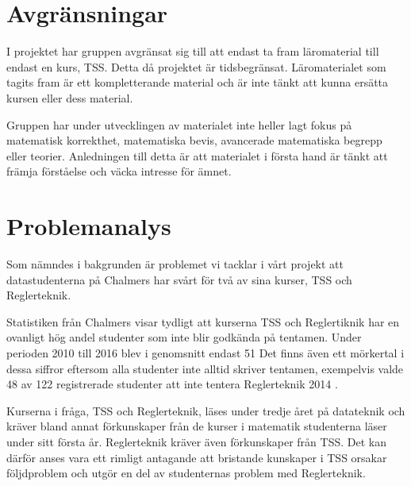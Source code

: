 \documentclass[]{article}
\begin{document}
\section{Avgränsningar}

I projektet har gruppen avgränsat sig till att endast ta fram läromaterial till endast en kurs, TSS. Detta då projektet är tidsbegränsat. Läromaterialet som tagits fram är ett kompletterande material och är inte tänkt att kunna ersätta kursen eller dess material.

Gruppen har under utvecklingen av materialet inte heller lagt fokus på matematisk korrekthet, matematiska bevis, avancerade matematiska begrepp eller teorier.  Anledningen till detta är att materialet  i första hand är tänkt att främja förståelse och väcka intresse för ämnet. 

\section{Problemanalys}


Som nämndes i bakgrunden är problemet vi tacklar i vårt projekt att datastudenterna på Chalmers har svårt för två av sina kurser, TSS och Reglerteknik. 

Statistiken från Chalmers visar tydligt att kurserna TSS och Reglertiknik har en ovanligt hög andel studenter som inte blir godkända på tentamen. Under perioden 2010 till 2016 blev i genomsnitt endast 51%
Det finns även ett mörkertal i dessa siffror eftersom alla studenter inte alltid skriver tentamen, exempelvis valde 48 av 122 registrerade studenter att inte tentera Reglerteknik 2014 \cite{kursinformation:ere102:14-15}.

Kurserna i fråga, TSS och Reglerteknik, läses under tredje året på datateknik och kräver bland annat förkunskaper från de kurser i matematik studenterna läser under sitt första år. Reglerteknik kräver även förkunskaper från TSS. Det kan därför anses vara ett rimligt antagande att bristande kunskaper i TSS orsakar följdproblem och utgör en del av studenternas problem med Reglerteknik.
\end{document}
